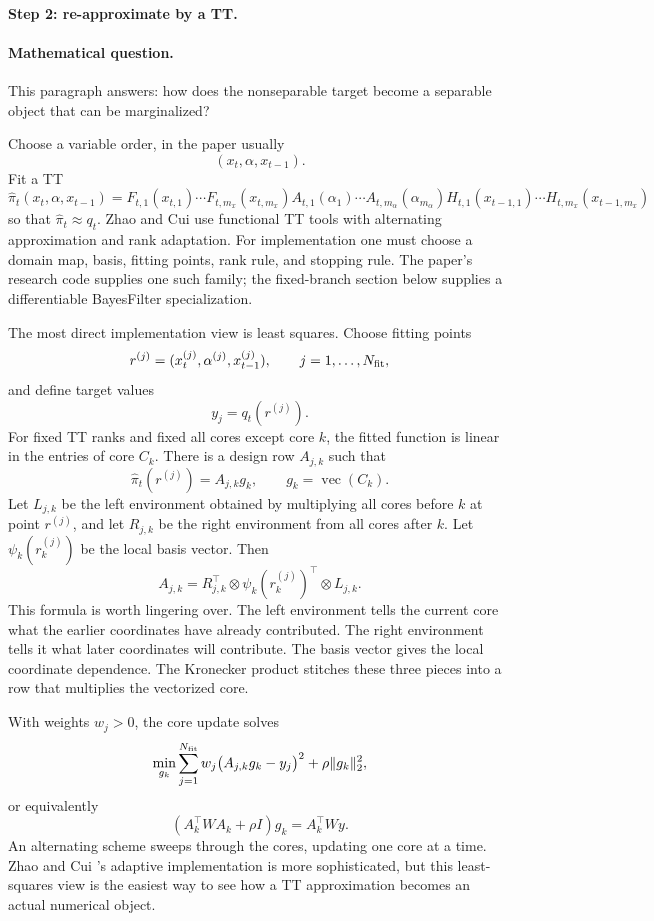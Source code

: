 \documentclass[11pt]{article}
\newcommand{\vecop}{\operatorname{vec}}
\begin{document}
\paragraph{Step 2: re-approximate by a TT.}
\paragraph{Mathematical question.}
This paragraph answers: how does the nonseparable target become a separable
object that can be marginalized?

Choose a variable order, in the paper usually
\[
    (x_t,\alpha,x_{t-1}).
\]
Fit a TT
\[
    \widehat\pi_t(x_t,\alpha,x_{t-1})
    =
    F_{t,1}(x_{t,1})\cdots F_{t,m_x}(x_{t,m_x})
    A_{t,1}(\alpha_1)\cdots A_{t,m_\alpha}(\alpha_{m_\alpha})
    H_{t,1}(x_{t-1,1})\cdots H_{t,m_x}(x_{t-1,m_x})
    \label{eq:p24-a1-2}
\]
so that \(\widehat\pi_t\approx q_t\).  Zhao and Cui \cite{zhao2024ttsequential} use functional TT tools with
alternating approximation and rank adaptation.  For implementation one must
choose a domain map, basis, fitting points, rank rule, and stopping rule.  The
paper's research code supplies one such family; the fixed-branch section below
supplies a differentiable BayesFilter specialization.

The most direct implementation view is least squares.  Choose fitting points
\[
    r^{(j)}=(x_t^{(j)},\alpha^{(j)},x_{t-1}^{(j)}),
    \qquad j=1,\ldots,N_{\rm fit},
\]
and define target values
\[
    y_j=q_t(r^{(j)}).
\]
For fixed TT ranks and fixed all cores except core \(k\), the fitted function is
linear in the entries of core \(C_k\).  There is a design row \(A_{j,k}\) such
that
\[
    \widehat\pi_t(r^{(j)})=A_{j,k}g_k,
    \qquad g_k=\vecop(C_k).
    \label{eq:p24-a1-2a}
\]
Let \(L_{j,k}\) be the left environment obtained by multiplying all cores before
\(k\) at point \(r^{(j)}\), and let \(R_{j,k}\) be the right environment from
all cores after \(k\).  Let
\(\psi_k(r_k^{(j)})\) be the local basis vector.  Then
\[
    A_{j,k}
    =
    R_{j,k}^{\top}\otimes \psi_k(r_k^{(j)})^\top\otimes L_{j,k}.
    \label{eq:p24-a1-2b}
\]
This formula is worth lingering over.  The left environment tells the current
core what the earlier coordinates have already contributed.  The right
environment tells it what later coordinates will contribute.  The basis vector
gives the local coordinate dependence.  The Kronecker product stitches these
three pieces into a row that multiplies the vectorized core.

With weights \(w_j>0\), the core update solves
\[
    \min_{g_k}
    \sum_{j=1}^{N_{\rm fit}}w_j\bigl(A_{j,k}g_k-y_j\bigr)^2
    +\rho\|g_k\|_2^2,
    \label{eq:p24-a1-2c}
\]
or equivalently
\[
    (A_k^\top W A_k+\rho I)g_k=A_k^\top Wy.
    \label{eq:p24-a1-2d}
\]
An alternating scheme sweeps through the cores, updating one core at a time.
Zhao and Cui \cite{zhao2024ttsequential}'s adaptive implementation is more sophisticated, but this least-
squares view is the easiest way to see how a TT approximation becomes an
actual numerical object.
\end{document}
